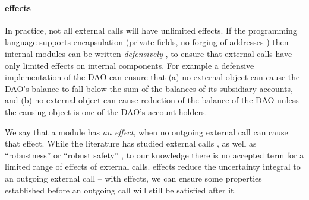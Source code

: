 \paragraph{\Tamed effects}  In practice, not all external calls will have unlimited effects.
{If the programming language supports encapsulation (\eg private
 fields, no forging of addresses %
 \etc) then internal modules can be
 written \emph{defensively} \cite{MillerPhD}, to ensure that external
 calls  {have only limited effects}  on internal components.} %
For example a defensive implementation of the DAO  \cite{Dao} can ensure that  (a)
{no external object can cause the DAO's balance to fall below the sum of the balances of its subsidiary accounts}, 
and (b) {no external object can cause reduction of the balance of the DAO unless the causing object is  one of the DAO's account holders.}
 

{We say that a module has \emph{\tamed an effect}, when
 {no} outgoing external call can cause that effect.}
{While the literature has studied external
calls \cite{vanproving,cerise-jacm2024,vmsl-pldi2023,ddd},  
as well as ``robustness'' or ``robust safety'' %
\cite{gordonJefferyRobustSafety,robustSafetyPatrignani,abate2019journey}, to our
knowledge there is no accepted term {for a limited range of effects of external calls.}}
\Tamed effects reduce the uncertainty integral to an outgoing external
call  --  with \tamed effects, we can ensure some properties established
before an outgoing call will still be satisfied after it. 

